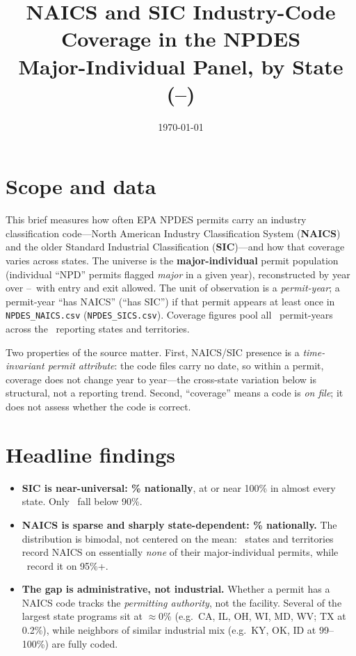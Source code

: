 \documentclass[11pt]{article}
\title{\vspace{-2.5em}NAICS and SIC Industry-Code Coverage in the NPDES\\
Major-Individual Panel, by State (\covYearMin--\covYearMax)}
\author{}
\date{\today}
\begin{document}
\maketitle
\vspace{-2.5em}

\section*{Scope and data}
This brief measures how often EPA NPDES permits carry an industry classification
code---North American Industry Classification System (\textbf{NAICS}) and the older
Standard Industrial Classification (\textbf{SIC})---and how that coverage varies
across states. The universe is the \textbf{major-individual} permit population
(individual ``NPD'' permits flagged \emph{major} in a given year), reconstructed
by year over \covYearMin--\covYearMax\ with entry and exit allowed. The unit of
observation is a \emph{permit-year}; a permit-year ``has NAICS'' (``has SIC'') if
that permit appears at least once in \texttt{NPDES\_NAICS.csv}
(\texttt{NPDES\_SICS.csv}). Coverage figures pool all \covPermitYears\ permit-years
across the \covNStates\ reporting states and territories.

Two properties of the source matter. First, NAICS/SIC presence is a
\emph{time-invariant permit attribute}: the code files carry no date, so within a
permit, coverage does not change year to year---the cross-state variation below is
structural, not a reporting trend. Second, ``coverage'' means a code is
\emph{on file}; it does not assess whether the code is correct.

\section*{Headline findings}
\begin{itemize}
  \item \textbf{SIC is near-universal: \covNatSic\% nationally}, at or near 100\% in
        almost every state. Only \covLoSicList\ fall below 90\%.
  \item \textbf{NAICS is sparse and sharply state-dependent: \covNatNaics\% nationally.}
        The distribution is bimodal, not centered on the mean: \covZeroNaics\ states
        and territories record NAICS on essentially \emph{none} of their
        major-individual permits, while \covHiNaics\ record it on 95\%+.
  \item \textbf{The gap is administrative, not industrial.} Whether a permit has a
        NAICS code tracks the \emph{permitting authority}, not the facility. Several
        of the largest state programs sit at $\approx$0\% (e.g.\ CA, IL, OH, WI, MD,
        WV; TX at 0.2\%), while neighbors of similar industrial mix (e.g.\ KY, OK, ID
        at 99--100\%) are fully coded.
\end{itemize}
\end{document}
